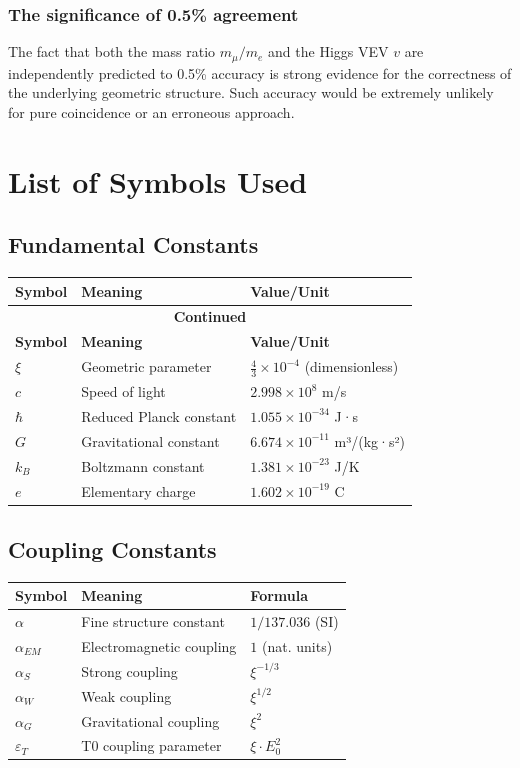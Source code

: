 \documentclass[12pt,a4paper]{report}
\begin{document}
\subsubsection{The significance of 0.5\% agreement}

The fact that both the mass ratio $m_\mu/m_e$ and the Higgs VEV $v$ are independently predicted to 0.5\% accuracy is strong evidence for the correctness of the underlying geometric structure. Such accuracy would be extremely unlikely for pure coincidence or an erroneous approach.

\section{List of Symbols Used}
\label{app:symbols_en}

\subsection{Fundamental Constants}
\begin{longtable}{lll}
	\toprule
	\textbf{Symbol} & \textbf{Meaning} & \textbf{Value/Unit} \\
	\midrule
	\endfirsthead
	\multicolumn{3}{c}{{\bfseries Continued}} \\
	\toprule
	\textbf{Symbol} & \textbf{Meaning} & \textbf{Value/Unit} \\
	\midrule
	\endhead
	\bottomrule
	\endfoot
	\bottomrule
	\endlastfoot
	
	$\xi$ & Geometric parameter & $\frac{4}{3} \times 10^{-4}$ (dimensionless) \\
	$c$ & Speed of light & $2.998 \times 10^8$ m/s \\
	$\hbar$ & Reduced Planck constant & $1.055 \times 10^{-34}$ J·s \\
	$G$ & Gravitational constant & $6.674 \times 10^{-11}$ m³/(kg·s²) \\
	$k_B$ & Boltzmann constant & $1.381 \times 10^{-23}$ J/K \\
	$e$ & Elementary charge & $1.602 \times 10^{-19}$ C \\
\end{longtable}
\normalsize

\subsection{Coupling Constants}
\begin{longtable}{lll}
	\toprule
	\textbf{Symbol} & \textbf{Meaning} & \textbf{Formula} \\
	\midrule
	$\alpha$ & Fine structure constant & $1/137.036$ (SI) \\
	$\alpha_{EM}$ & Electromagnetic coupling & $1$ (nat. units) \\
	$\alpha_S$ & Strong coupling & $\xi^{-1/3}$ \\
	$\alpha_W$ & Weak coupling & $\xi^{1/2}$ \\
	$\alpha_G$ & Gravitational coupling & $\xi^{2}$ \\
	$\varepsilon_T$ & T0 coupling parameter & $\xi \cdot E_0^2$ \\
	\bottomrule
\end{longtable}
\normalsize
\end{document}

